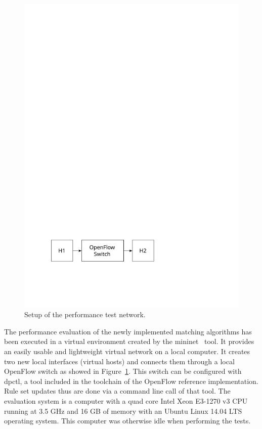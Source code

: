 \documentclass[a4paper,
		12pt,
		parskip=full,
		titlepage
		]{scrartcl}
\begin{document}
\begin{figure}[H]
\centering
\includegraphics[height=0.1\textheight]{images/ofswitch-perftest}
\caption{Setup of the performance test network.}
\label{fig:ofswitch-perftest}
\end{figure}

The performance evaluation of the newly implemented matching algorithms has 
been executed in a virtual environment created by the \textsf{mininet}~\cite{mininet} tool.
It provides an easily usable and lightweight virtual network on a local computer.
It creates two new local interfaces (virtual hosts) and connects them through 
a local OpenFlow switch as showed in Figure~\ref{fig:ofswitch-perftest}.
This switch can be configured with \textsf{dpctl}, a tool included in the toolchain of the OpenFlow reference implementation.
Rule set updates thus are done via a command line call of that tool.
The evaluation system is a computer with a quad core Intel Xeon E3-1270 v3 CPU 
running at 3.5 GHz and 16 GB of memory with an Ubuntu Linux 14.04 LTS operating system.
This computer was otherwise idle when performing the tests.
\end{document}

